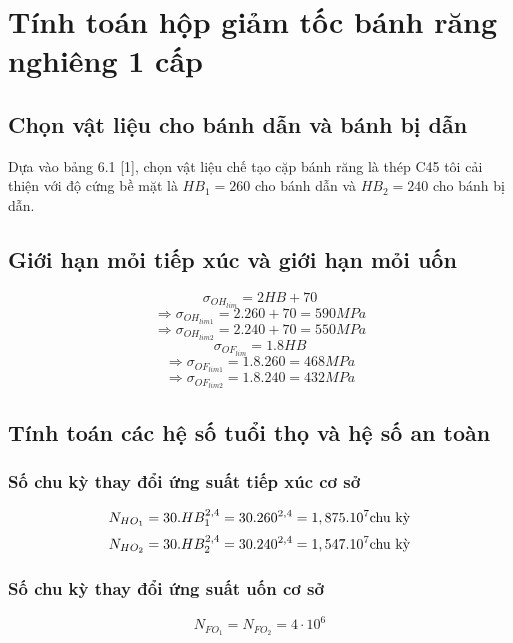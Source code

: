 \chapter{Tính toán hộp giảm tốc bánh răng nghiêng 1 cấp}
\section{Chọn vật liệu cho bánh dẫn và bánh bị dẫn}
Dựa vào bảng 6.1 [1], chọn vật liệu chế tạo cặp bánh răng là thép C45 tôi cải thiện với độ cứng bề mặt là $HB_1=260$ cho bánh dẫn và $HB_2=240$ cho bánh bị dẫn.

\section{Giới hạn mỏi tiếp xúc và giới hạn mỏi uốn}
\begin{equation}
    \sigma_{OH_{lim}} = 2HB + 70 
\end{equation}
\[
    \Rightarrow \sigma_{OH_{lim1}} = 2.260 + 70 = 590MPa
\]
\[
    \Rightarrow \sigma_{OH_{lim2}} = 2.240 + 70 = 550MPa
\]
\begin{equation}
    \sigma_{OF_{lim}} = 1.8HB
\end{equation}
\[
    \Rightarrow \sigma_{OF_{lim1}} = 1.8.260 = 468MPa
\]
\[
    \Rightarrow \sigma_{OF_{lim2}} = 1.8.240 = 432MPa
\]

\section{Tính toán các hệ số tuổi thọ và hệ số an toàn}
\subsection{Số chu kỳ thay đổi ứng suất tiếp xúc cơ sở}
\begin{equation}
        N_{HO_1} = 30.HB_1^{2,4} = 30.260^{2,4} = 1,875.10^7 \text{chu kỳ} \\
\end{equation}
\begin{equation}
        N_{HO_2} = 30.HB_2^{2,4} = 30.240^{2,4} = 1,547.10^7 \text{chu kỳ} \\
\end{equation}
\subsection{Số chu kỳ thay đổi ứng suất uốn cơ sở}
\begin{equation}
    N_{FO_1} = N_{FO_2} = 4 \cdot 10^6
\end{equation}

